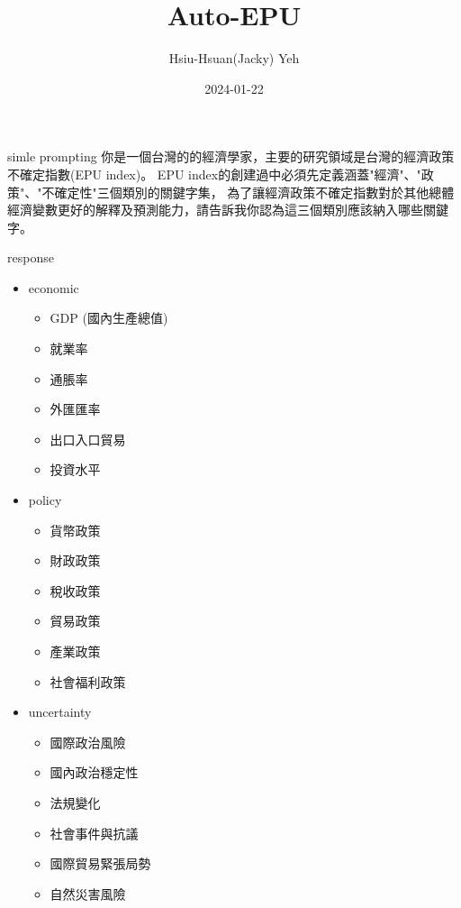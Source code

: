 \documentclass[12pt]{beamer}
\title{\huge{Auto-EPU}}
\author{Hsiu-Hsuan(Jacky) Yeh}
\date{2024-01-22}
\begin{document}
\maketitle
\begin{frame}{simle prompting}
你是一個台灣的的經濟學家，主要的研究領域是台灣的經濟政策不確定指數(EPU index)。
EPU index的創建過中必須先定義涵蓋"經濟"、"政策"、"不確定性"三個類別的關鍵字集，
為了讓經濟政策不確定指數對於其他總體經濟變數更好的解釋及預測能力，請告訴我你認為這三個類別應該納入哪些關鍵字。
\end{frame}

\begin{frame}{response}
\begin{itemize}
    \item economic
        \begin{itemize}
            \item GDP (國內生產總值)
            \item 就業率
            \item 通脹率
            \item 外匯匯率
            \item 出口入口貿易
            \item 投資水平
        \end{itemize}
    \item policy
        \begin{itemize}
            \item 貨幣政策
            \item 財政政策
            \item 稅收政策
            \item 貿易政策
            \item 產業政策
            \item 社會福利政策
        \end{itemize}
    \item uncertainty
        \begin{itemize}
            \item 國際政治風險
            \item 國內政治穩定性
            \item 法規變化
            \item 社會事件與抗議
            \item 國際貿易緊張局勢
            \item 自然災害風險
        \end{itemize}
\end{itemize}
\end{frame}
\end{document}
